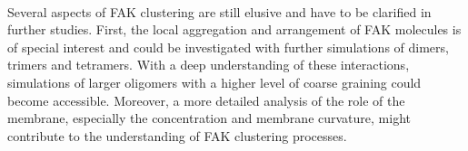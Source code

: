 \\
Several aspects of FAK clustering are still elusive and have to be clarified in further studies. First, the local aggregation and arrangement of FAK molecules is of special interest and could be investigated with further simulations of dimers, trimers and tetramers. With a deep understanding of these interactions, simulations of larger oligomers with a higher level of coarse graining could become accessible. Moreover, a more detailed analysis of the role of the membrane, especially the \pip{} concentration and membrane curvature, might contribute to the understanding of FAK clustering processes.


